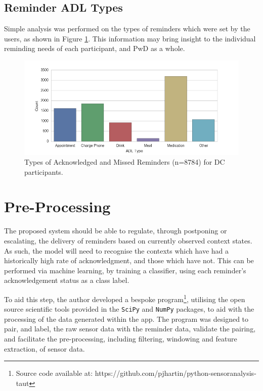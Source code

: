 \subsection{Reminder ADL Types}
Simple analysis was performed on the types of reminders which were set by the users, as shown in Figure \ref{fig: adl-type}. This information may bring insight to the individual reminding needs of each participant, and PwD as a whole.

\begin{figure}[h]
    \centering
        \includegraphics[scale=0.7, angle=0]{Files/treatment-study-1/figures/adl-type}
        \caption{Types of Acknowledged and Missed Reminders (n=8784) for DC participants.}
        \label{fig: adl-type}
\end{figure}


\section{Pre-Processing}
The proposed system should be able to regulate, through postponing or escalating, the delivery of reminders based on currently observed context states.
As such, the model will need to recognise the contexts which have had a historically high rate of acknowledgment, and those which have not. This can be performed via machine learning, by training a classifier, using each reminder's acknowledgement status as a class label.

To aid this step, the author developed a bespoke program\footnote{Source code available at: https://github.com/pjhartin/python-sensoranalysis-taut}, utilising the open source scientific tools provided in the \texttt{SciPy} and \texttt{NumPy} packages, to aid with the processing of the data generated within the app. The program was designed to pair, and label, the raw sensor data with the reminder data, validate the pairing, and facilitate the pre-processing, including filtering, windowing and feature extraction, of sensor data.

